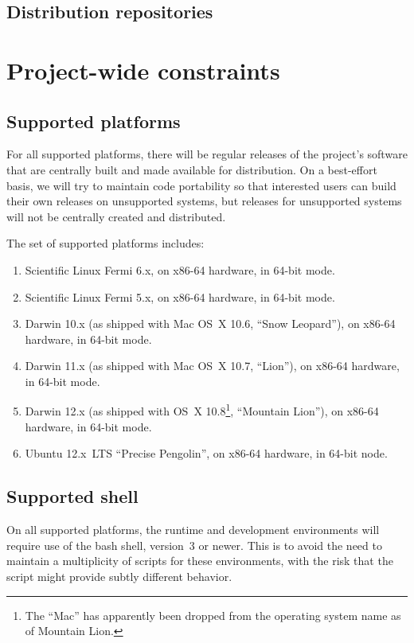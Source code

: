 \documentclass[draftmode,draftwater]{memarticle}
\begin{document}
\subsection{Distribution repositories}


\section{Project-wide constraints}

\subsection{Supported platforms}

For all supported platforms, there will be regular releases of the
project's software that are centrally built and made available for
distribution. On a best-effort basis, we will try to maintain code
portability so that interested users can build their own releases on
unsupported systems, but releases for unsupported systems will not be
centrally created and distributed.

The set of supported platforms includes:
\begin{enumerate}
\item Scientific Linux Fermi 6.x, on x86-64 hardware, in 64-bit mode.
\item Scientific Linux Fermi 5.x, on x86-64 hardware, in 64-bit mode.
\item Darwin 10.x (as shipped with Mac OS~X 10.6, ``Snow Leopard''), on
  x86-64 hardware, in 64-bit mode.
\item Darwin 11.x (as shipped with Mac OS~X 10.7, ``Lion''), on x86-64
  hardware, in 64-bit mode.
\item Darwin 12.x (as shipped with OS~X 10.8\footnote{The ``Mac'' has
    apparently been dropped from the operating system name as of
    Mountain Lion.}, ``Mountain Lion''), on x86-64 hardware, in 64-bit
  mode.
\item Ubuntu 12.x~LTS ``Precise Pengolin'', on x86-64 hardware, in
  64-bit node.
\end{enumerate}

\subsection{Supported shell}

On all supported platforms, the runtime and development environments
will require use of the bash shell, version~3 or newer. This is to avoid
the need to maintain a multiplicity of scripts for these environments,
with the risk that the script might provide subtly different behavior.
\end{document}
